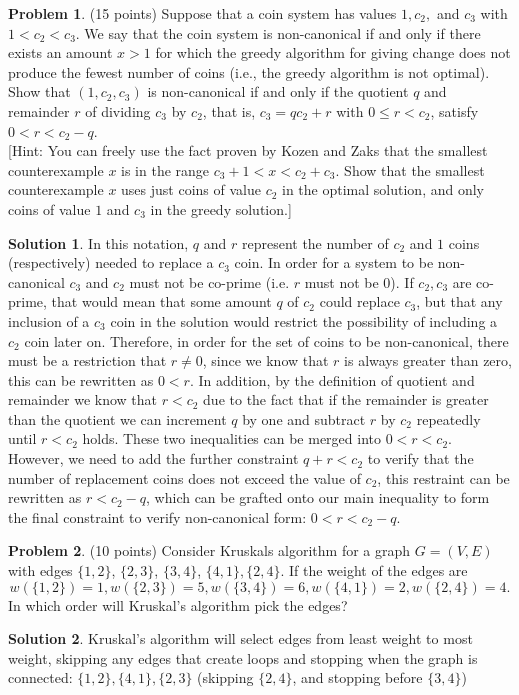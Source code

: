 \documentclass{article}
\theoremstyle{definition}
\newtheorem{problem}{Problem}
\newtheorem*{solution}{Solution}
\begin{document}
\begin{problem} (15 points)
Suppose that a coin system has values $1, c_2,$ and  $c_3$ with
$1<c_2<c_3$. We say that the coin system is non-canonical if and only
if there exists an amount $x>1$ for which the greedy algorithm for
giving change does not produce the fewest number of coins (i.e., the
greedy algorithm is not optimal). Show that $(1,c_2,c_3)$ is
non-canonical if and only if the quotient $q$ and remainder $r$ of
dividing $c_3$ by $c_2$, that is, 
$c_3 = qc_2+r$ with $0\le r<c_2$, 
satisfy $0< r < c_2 - q$. \\{}
[Hint: You can freely use the fact proven by Kozen and Zaks that the 
smallest counterexample $x$ is in the range $c_3+1 < x < c_2+c_3$.
Show that the smallest counterexample $x$ uses just coins of value
$c_2$ in the optimal solution, and only coins of value $1$ and $c_3$
in the greedy solution.]
\end{problem}
\begin{solution}
In this notation, $q$ and $r$ represent the number of $c_2$ and $1$ coins (respectively) needed to replace a $c_3$ coin. In order for a system to be non-canonical $c_3$ and $c_2$ must not be co-prime (i.e. $r$ must not be 0). If $c_2,c_3$ are co-prime, that would mean that some amount $q$ of $c_2$ could replace $c_3$, but that any inclusion of a $c_3$ coin in the solution would restrict the possibility of including a $c_2$ coin later on. Therefore, in order for the set of coins to be non-canonical, there must be a restriction that $r \neq 0$, since we know that $r$ is always greater than zero, this can be rewritten as $0 < r$. In addition, by the definition of quotient and remainder we know that $r < c_2$ due to the fact that if the remainder is greater than the quotient we can increment $q$ by one and subtract $r$ by $c_2$ repeatedly until $r < c_2$ holds. These two inequalities can be merged into $0 < r < c_2$. However, we need to add the further constraint $q+r < c_2$ to verify that the number of replacement coins does not exceed the value of $c_2$, this restraint can be rewritten as $r < c_2 - q$, which can be grafted onto our main inequality to form the final constraint to verify non-canonical form: $0 < r < c_2 - q$.
\end{solution}

\begin{problem} (10 points)
Consider Kruskals algorithm for a graph $G=(V,E)$ with edges 
$\{1,2\}$, $\{2,3\}$, $\{3,4\}$, $\{4,1\}, \{2,4\}$. If the weight of the edges
are 
$$ w(\{1,2\})=1, w(\{2,3\})=5, w(\{3,4\})=6, w(\{4,1\})=2, w(\{2,4\})=4.$$
In which order will Kruskal's algorithm pick the edges? 
\end{problem}
\begin{solution}
Kruskal's algorithm will select edges from least weight to most weight, skipping any edges that create loops and stopping when the graph is connected: $\{1,2\},\{4,1\},\{2,3\}$ (skipping $\{2,4\}$, and stopping before $\{3,4\}$)
\end{solution}
\end{document}
